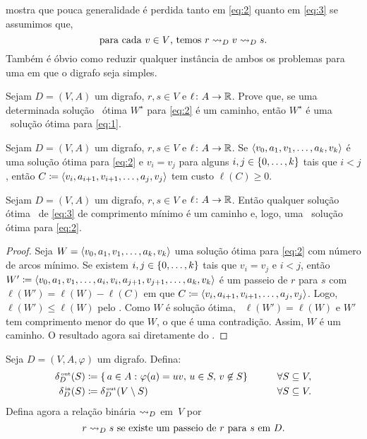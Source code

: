 \documentclass[10pt,reqno]{amsart}
\begin{document}
 mostra que pouca generalidade é perdida tanto em
\eqref{eq:2} quanto em \eqref{eq:3} se assumimos que,
\begin{equation}
  \label{eq:4}
  \text{para cada \(v \in V\), temos \(r \reaches_D v \reaches_D s\).}
\end{equation}
Também é óbvio como reduzir qualquer instância de ambos os problemas para 
uma em que o digrafo seja simples.

\begin{exercise}
  \label{ex:2}
  Sejam \(D = (V,A)\) um digrafo, \(r,s \in V\) e
  \(\ell \colon A \to \mathbb{R}\).  Prove que, se uma determinada solução
  ótima \(W^\star\) para \eqref{eq:2} é um caminho, então \(W^\star\) é uma
  solução ótima para \eqref{eq:1}.
\end{exercise}

\begin{exercise}
  \label{ex:3}
  Sejam \(D = (V,A)\) um digrafo, \(r,s \in V\) e
  \(\ell \colon A \to \mathbb{R}\).  Se
  \(\langle v_0,a_1,v_1,\dotsc,a_k,v_k\rangle\) é uma solução ótima
  para \eqref{eq:2} e \(v_i = v_j\) para alguns
  \(i,j \in \{0,\dotsc,k\}\) tais que \(i < j\), então
  \(C \coloneqq \langle v_i,a_{i+1},v_{i+1},\dotsc,a_j,v_j\rangle\) tem custo
  \(\ell(C) \geq 0\).
\end{exercise}

\begin{proposition}
  \label{prop:1}
  Sejam \(D = (V,A)\) um digrafo, \(r,s \in V\) e
  \(\ell \colon A \to \mathbb{R}\).  Então qualquer solução ótima
  de \eqref{eq:3} de comprimento mínimo é um caminho e, logo, uma
  solução ótima para \eqref{eq:2}.
\end{proposition}
\begin{proof}
  Seja \(W = \langle v_0,a_1,v_1,\dotsc,a_k,v_k\rangle\) uma solução ótima
  para \eqref{eq:2} com número de arcos mínimo.  Se existem
  \(i,j \in \{0,\dotsc,k\}\) tais que \(v_i = v_j\) e \(i < j\),
  então
  \(W' \coloneqq
  \langle v_0,a_1,v_1,\dotsc,a_i,v_i,a_{j+1},v_{j+1},\dotsc,a_k,v_k\rangle\) é
  um passeio de \(r\) para \(s\) com \(\ell(W') = \ell(W) - \ell(C)\) em que
  \(C \coloneqq \langle v_i,a_{i+1},v_{i+1},\dotsc,a_j,v_j\rangle\). Logo,
  \(\ell(W') \leq \ell(W)\) pelo .  Como \(W\) é solução ótima,
  \(\ell(W') = \ell(W)\) e \(W'\) tem comprimento menor do que \(W\), o que
  é uma contradição.  Assim, \(W\) é um caminho.  O resultado agora sai
  diretamente do .
\end{proof}

Seja \(D = (V,A,\varphi)\) um digrafo.  Defina:
\begin{alignat*}{2}
  \label{eq:5}
  \deltaout[D](S)
  & \coloneqq
  \setst{
    a \in A
  }{
    \varphi(a) = uv,\,
    u \in S,\,
    v \not\in S
  }
  & \qquad &
  \forall S \subseteq V,
  \\
  \deltain[D](S)
  & \coloneqq
  \deltaout[D](V \setminus S)
  & \qquad &
  \forall S \subseteq V.
\end{alignat*}
Defina agora a relação binária \(\rightsquigarrow_D\) em~\(V\) por
\begin{equation*}
  r \rightsquigarrow_D s
  \text{ se existe um passeio de~\(r\) para~\(s\) em~\(D\)}.
\end{equation*}
\end{document}
